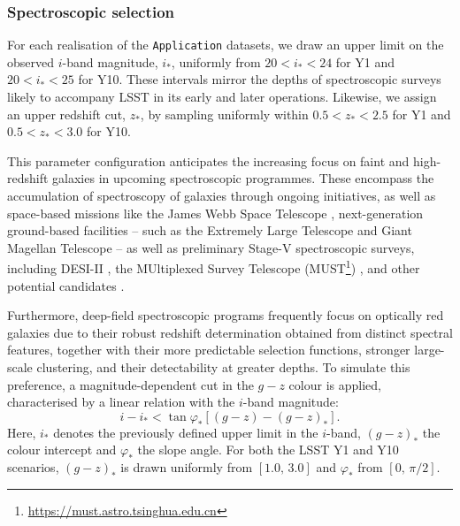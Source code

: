 \subsubsection{Spectroscopic selection}

For each realisation of the \texttt{Application} datasets, we draw an upper limit on the observed \(i\)-band magnitude, \(i_\ast\), uniformly from \(20  < i_\ast < 24 \) for Y1 and \(20  < i_\ast < 25 \) for Y10. These intervals mirror the depths of spectroscopic surveys likely to accompany LSST in its early and later operations.  Likewise, we assign an upper redshift cut, \(z_\ast\), by sampling uniformly within \(0.5 < z_\ast < 2.5\) for Y1 and \(0.5 < z_\ast < 3.0\) for Y10. 

This parameter configuration anticipates the increasing focus on faint and high-redshift galaxies in upcoming spectroscopic programmes. These encompass the accumulation of spectroscopy of galaxies through ongoing initiatives, as well as space-based missions like the James Webb Space Telescope \citep[JWST\footnote{\url{https://webbtelescope.org/home}};][]{2006SSRv..123..485G}, next-generation ground-based facilities -- such as the Extremely Large Telescope \citep[ELT\footnote{\url{https://elt.eso.org}};][]{2023ConPh..64...47P} and Giant Magellan Telescope \citep[GMT\footnote{\url{https://giantmagellan.org}};][]{2024SPIE13094E..17B} -- as well as preliminary Stage-V spectroscopic surveys, including DESI-II \citep{2022arXiv220903585S}, the MUltiplexed Survey Telescope (MUST\footnote{\url{https://must.astro.tsinghua.edu.cn}}) \citep{2024arXiv241107970Z}, and other potential candidates \citep{2022arXiv220904322S, 2025arXiv250307923B}.

Furthermore, deep-field spectroscopic programs frequently focus on optically red galaxies due to their robust redshift determination obtained from distinct spectral features, together with their more predictable selection functions, stronger large-scale clustering, and their detectability at greater depths. To simulate this preference, a magnitude-dependent cut in the \(g - z\) colour is applied, characterised by a linear relation with the \(i\)-band magnitude:
\begin{equation} \label{eqa:1} 
    i - i_\ast < \tan{\varphi_\ast} \left[ \left( g - z \right) - \left( g - z \right)_\ast \right].
\end{equation} 
Here, \(i_\ast\) denotes the previously defined upper limit in the \(i\)-band, \((g - z)_\ast\) the colour intercept and \(\varphi_\ast\) the slope angle. For both the LSST Y1 and Y10 scenarios, \((g - z)_\ast\) is drawn uniformly from \([1.0,\,3.0]\) and \(\varphi_\ast\) from \([0,\,\pi/2]\). 


